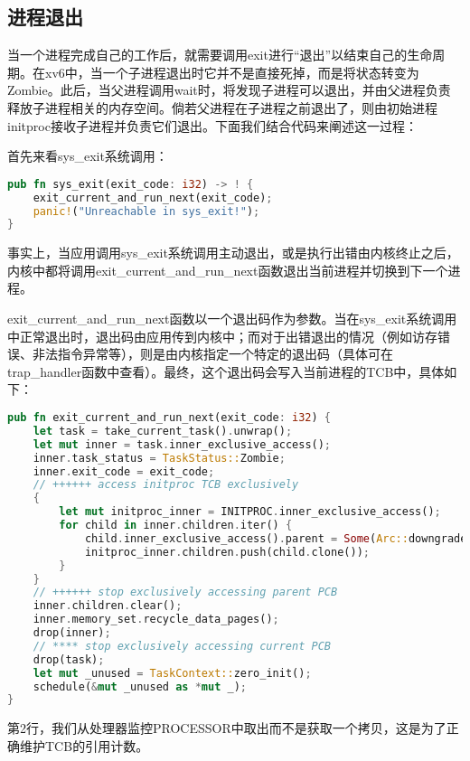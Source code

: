 \subsection{进程退出}

当一个进程完成自己的工作后，就需要调用exit进行“退出”以结束自己的生命周期。在xv6中，当一个子进程退出时它并不是直接死掉，而是将状态转变为Zombie。此后，当父进程调用wait时，将发现子进程可以退出，并由父进程负责释放子进程相关的内存空间。倘若父进程在子进程之前退出了，则由初始进程initproc接收子进程并负责它们退出。下面我们结合代码来阐述这一过程：

首先来看sys\_exit系统调用：

\begin{lstlisting}[language={Rust}, label={code:exit},
	caption={os/src/syscall/process.rs}]
pub fn sys_exit(exit_code: i32) -> ! {
	exit_current_and_run_next(exit_code);
	panic!("Unreachable in sys_exit!");
}
\end{lstlisting}

事实上，当应用调用sys\_exit系统调用主动退出，或是执行出错由内核终止之后，内核中都将调用exit\_current\_and\_run\_next函数退出当前进程并切换到下一个进程。

exit\_current\_and\_run\_next函数以一个退出码作为参数。当在sys\_exit系统调用中正常退出时，退出码由应用传到内核中；而对于出错退出的情况（例如访存错误、非法指令异常等），则是由内核指定一个特定的退出码（具体可在trap\_handler函数中查看）。最终，这个退出码会写入当前进程的TCB中，具体如下：

\begin{lstlisting}[language={Rust}, label={code:exit},
	caption={os/src/task/mod.rs}]
pub fn exit_current_and_run_next(exit_code: i32) {
	let task = take_current_task().unwrap();
	let mut inner = task.inner_exclusive_access();
	inner.task_status = TaskStatus::Zombie;
	inner.exit_code = exit_code;
	// ++++++ access initproc TCB exclusively
	{
		let mut initproc_inner = INITPROC.inner_exclusive_access();
		for child in inner.children.iter() {
			child.inner_exclusive_access().parent = Some(Arc::downgrade(&INITPROC));
			initproc_inner.children.push(child.clone());
		}
	}
	// ++++++ stop exclusively accessing parent PCB
	inner.children.clear();
	inner.memory_set.recycle_data_pages();
	drop(inner);
	// **** stop exclusively accessing current PCB
	drop(task);
	let mut _unused = TaskContext::zero_init();
	schedule(&mut _unused as *mut _);
}
\end{lstlisting}

第2行，我们从处理器监控PROCESSOR中取出而不是获取一个拷贝，这是为了正确维护TCB的引用计数。

